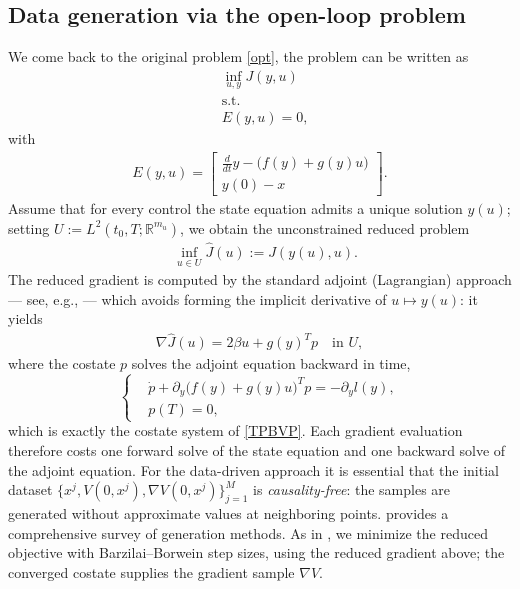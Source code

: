 \documentclass[11pt]{amsart}
\theoremstyle{definition}
\theoremstyle{remark}
\begin{document}
\subsection{Data generation via the open-loop problem}
We come back to the original problem \eqref{opt}, the problem can be written as 
\begin{align*}
	&  \inf_{u, y} J(y, u)\\
	& \text{s.t.}\\
	& E(y, u) = 0,
\end{align*} 
with 
\begin{align*}
	E(y, u) = 
	\begin{bmatrix}
		\frac{d}{dt} y - \bigg(f(y) + g(y) u \bigg)\\
		y(0) - x 
	\end{bmatrix}.
\end{align*}
Assume that for every control the state equation admits a unique solution $y(u)$; setting $U:= L^2(t_0, T; \mathbb{R}^{m_u})$, we obtain the unconstrained reduced problem
\begin{align*}
	& \inf_{u \in U} \hat{J}(u) := J(y(u), u).
\end{align*}
The reduced gradient is computed by the standard adjoint (Lagrangian) approach --- see, e.g., \cite{hinze2009optimization} --- which avoids forming the implicit derivative of $u \mapsto y(u)$: it yields
\begin{align*}
	\nabla \hat{J}(u) = 2 \beta u + g(y)^T p \quad \text{in } U,
\end{align*}
where the costate $p$ solves the adjoint equation backward in time,
\begin{equation*}
\left\{
\begin{aligned}
	& \dot{p} + \partial_y\big(f(y) + g(y) u\big)^T p = -\partial_y l(y),\\
	& p(T) = 0,
\end{aligned}
\right.
\end{equation*}
which is exactly the costate system of \eqref{TPBVP}. Each gradient evaluation therefore costs one forward solve of the state equation and one backward solve of the adjoint equation.
For the data-driven approach it is essential that the initial dataset $\{x^j, V(0, x^j), \nabla V(0, x^j)\}_{j = 1}^M$ is \emph{causality-free}: the samples are generated without approximate values at neighboring points. \cite{kang2021algorithms} provides a comprehensive survey of generation methods. As in \cite{azmi2021optimal}, we minimize the reduced objective with Barzilai--Borwein step sizes, using the reduced gradient above; the converged costate supplies the gradient sample $\nabla V$.
\end{document}
